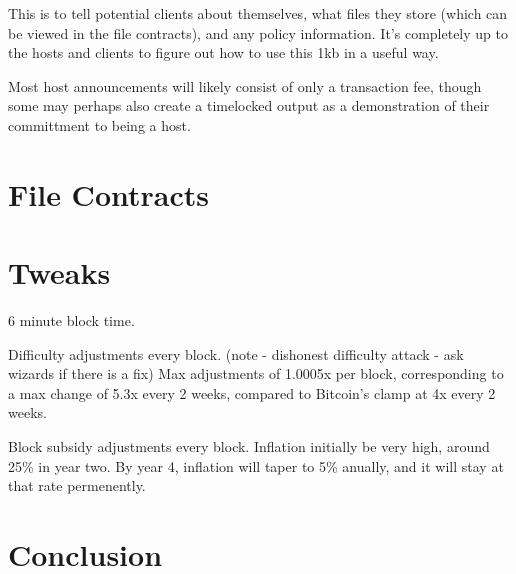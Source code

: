 \documentclass[twocolumn]{article}
\begin{document}
This is to tell potential clients about themselves, what files they store (which can be viewed in the file contracts), and any policy information.
It's completely up to the hosts and clients to figure out how to use this 1kb in a useful way.

Most host announcements will likely consist of only a transaction fee, though some may perhaps also create a timelocked output as a demonstration of their committment to being a host.

\section{File Contracts}

\section{Tweaks}
6 minute block time.

Difficulty adjustments every block. (note - dishonest difficulty attack - ask wizards if there is a fix)
Max adjustments of 1.0005x per block, corresponding to a max change of 5.3x every 2 weeks, compared to Bitcoin's clamp at 4x every 2 weeks.

Block subsidy adjustments every block.
Inflation initially be very high, around 25\% in year two.
By year 4, inflation will taper to 5\% anually, and it will stay at that rate permenently.

\section{Conclusion}

\onecolumn
\begin{bibliography}{2}

\bibitem{}

\end{bibliography}
\end{document}
